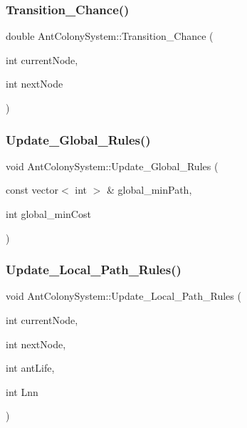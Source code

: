 \subsubsection{\texorpdfstring{Transition\+\_\+\+Chance()}{Transition\_Chance()}}
{\footnotesize\ttfamily double Ant\+Colony\+System\+::\+Transition\+\_\+\+Chance (\begin{DoxyParamCaption}\item[{int}]{current\+Node,  }\item[{int}]{next\+Node }\end{DoxyParamCaption})}

\mbox{\label{class_ant_colony_system_a0131a66f37712412b646f6a960c99e50}} 
\subsubsection{\texorpdfstring{Update\+\_\+\+Global\+\_\+\+Rules()}{Update\_Global\_Rules()}}
{\footnotesize\ttfamily void Ant\+Colony\+System\+::\+Update\+\_\+\+Global\+\_\+\+Rules (\begin{DoxyParamCaption}\item[{const vector$<$ int $>$ \&}]{global\+\_\+min\+Path,  }\item[{int}]{global\+\_\+min\+Cost }\end{DoxyParamCaption})}

\mbox{\label{class_ant_colony_system_ab0c9ef616e5754c3d9a4b3f18758c29d}} 
\subsubsection{\texorpdfstring{Update\+\_\+\+Local\+\_\+\+Path\+\_\+\+Rules()}{Update\_Local\_Path\_Rules()}}
{\footnotesize\ttfamily void Ant\+Colony\+System\+::\+Update\+\_\+\+Local\+\_\+\+Path\+\_\+\+Rules (\begin{DoxyParamCaption}\item[{int}]{current\+Node,  }\item[{int}]{next\+Node,  }\item[{int}]{ant\+Life,  }\item[{int}]{Lnn }\end{DoxyParamCaption})}



